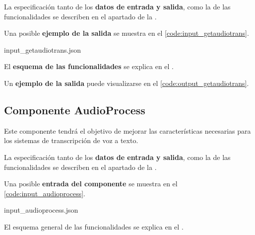 \documentclass[../main.tex]{subfiles}
\begin{document}
La especificación tanto de los \textbf{datos de entrada y salida}, como la de las funcionalidades se describen en el apartado  de la .

Una posible \textbf{ejemplo de la salida} se muestra en el \autoref{code:input_getaudiotrans}.

                {input_getaudiotrans.json}

El \textbf{esquema de las funcionalidades} se explica en el .

Un \textbf{ejemplo de la salida} puede visualizarse en el \autoref{code:output_getaudiotrans}.



\subsection{Componente AudioProcess}\label{subsec:impl_audioprocess}
Este componente tendrá el objetivo de mejorar las características necesarias para los sistemas de transcripción de voz a texto.

La especificación tanto de los \textbf{datos de entrada y salida}, como la de las funcionalidades se describen en el apartado  de la .

Una posible \textbf{entrada del componente} se muestra en el \autoref{code:input_audioprocess}.

                {input_audioprocess.json}


El esquema general de las funcionalidades se explica en el .
\end{document}

